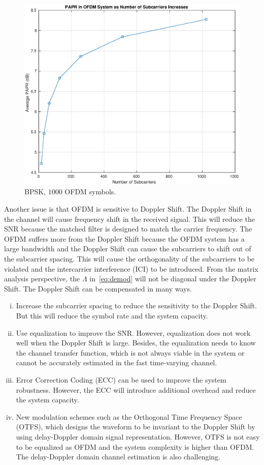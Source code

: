 \begin{figure}[!htbp]
    \centering
    \includegraphics[width=\linewidth]{PAPR.eps}
    \caption{BPSK, $1000$ OFDM symbols.}
    \label{fig:PAPR}
\end{figure}

Another issue is that OFDM is sensitive to Doppler Shift. The Doppler Shift in the channel will cause frequency shift in the received signal. This will reduce the SNR because the matched filter is designed to match the carrier frequency. The OFDM suffers more from the Doppler Shift because the OFDM system has a large bandwidth and the Doppler Shift can cause the subcarriers to shift out of the subcarrier spacing. This will cause the orthogonality of the subcarriers to be violated and the intercarrier interference (ICI) to be introduced. From the matrix analysis perspective, the $\Lambda$ in~\cref{eq:demod} will not be diagonal under the Doppler Shift. The Doppler Shift can be compensated in many ways.
\begin{enumerate}[(i)]
    \item Increase the subcarrier spacing to reduce the sensitivity to the Doppler Shift. But this will reduce the symbol rate and the system capacity.
    \item Use equalization to improve the SNR. However, equalization does not work well when the Doppler Shift is large. Besides, the equalization needs to know the channel transfer function, which is not always viable in the system or cannot be accurately estimated in the fast time-varying channel.
    \item Error Correction Coding (ECC) can be used to improve the system robustness. However, the ECC will introduce additional overhead and reduce the system capacity.
    \item New modulation schemes such as the Orthogonal Time Frequency Space (OTFS), which designs the waveform to be invariant to the Doppler Shift by using delay-Doppler domain signal representation. However, OTFS is not easy to be equalized as OFDM and the system complexity is higher than OFDM. The delay-Doppler domain channel estimation is also challenging.
\end{enumerate}

